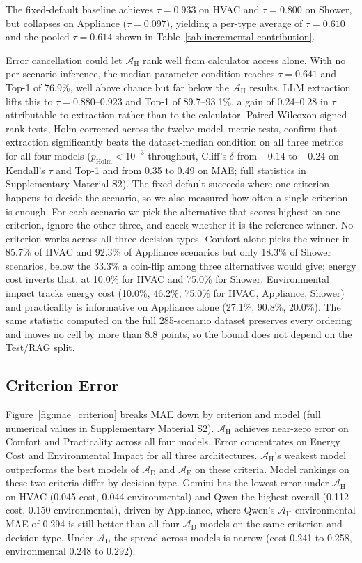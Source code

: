 \documentclass[final,3p,times]{elsarticle}
\begin{document}
The fixed-default baseline achieves $\tau = 0.933$ on HVAC and $\tau = 0.800$ on Shower, but collapses on Appliance ($\tau = 0.097$), yielding a per-type average of $\tau = 0.610$ and the pooled $\tau = 0.614$ shown in Table~\ref{tab:incremental-contribution}.

Error cancellation could let $\mathcal{A}_{\text{H}}$ rank well from calculator access alone. With no per-scenario inference, the median-parameter condition reaches $\tau = 0.641$ and Top-1 of 76.9\%, well above chance but far below the $\mathcal{A}_{\text{H}}$ results. LLM extraction lifts this to $\tau = 0.880$--$0.923$ and Top-1 of 89.7--93.1\%, a gain of 0.24--0.28 in $\tau$ attributable to extraction rather than to the calculator. Paired Wilcoxon signed-rank tests, Holm-corrected across the twelve model--metric tests, confirm that extraction significantly beats the dataset-median condition on all three metrics for all four models ($p_{\text{Holm}} < 10^{-3}$ throughout, Cliff's $\delta$ from $-0.14$ to $-0.24$ on Kendall's $\tau$ and Top-1 and from 0.35 to 0.49 on MAE; full statistics in Supplementary Material S2). 
The fixed default succeeds where one criterion happens to decide the scenario, so we also measured how often a single criterion is enough. For each scenario we pick the alternative that scores highest on one criterion, ignore the other three, and check whether it is the reference winner. No criterion works across all three decision types. Comfort alone picks the winner in 85.7\% of HVAC and 92.3\% of Appliance scenarios but only 18.3\% of Shower scenarios, below the 33.3\% a coin-flip among three alternatives would give; energy cost inverts that, at 10.0\% for HVAC and 75.0\% for Shower. Environmental impact tracks energy cost (10.0\%, 46.2\%, 75.0\% for HVAC, Appliance, Shower) and practicality is informative on Appliance alone (27.1\%, 90.8\%, 20.0\%). The same statistic computed on the full 285-scenario dataset preserves every ordering and moves no cell by more than 8.8 points, so the bound does not depend on the Test/RAG split.

\FloatBarrier
\subsection{Criterion Error}
\label{sec:res-error}
Figure~\ref{fig:mae_criterion} breaks MAE down by criterion and model (full numerical values in Supplementary Material S2). $\mathcal{A}_{\text{H}}$ achieves near-zero error on Comfort and Practicality across all four models. Error concentrates on Energy Cost and Environmental Impact for all three architectures. $\mathcal{A}_{\text{H}}$'s weakest model outperforms the best models of $\mathcal{A}_{\text{D}}$ and $\mathcal{A}_{\text{E}}$ on these criteria. Model rankings on these two criteria differ by decision type. Gemini has the lowest error under $\mathcal{A}_{\text{H}}$ on HVAC (0.045 cost, 0.044 environmental) and Qwen the highest overall (0.112 cost, 0.150 environmental), driven by Appliance, where Qwen's $\mathcal{A}_{\text{H}}$ environmental MAE of 0.294 is still better than all four $\mathcal{A}_{\text{D}}$ models on the same criterion and decision type. Under $\mathcal{A}_{\text{D}}$ the spread across models is narrow (cost 0.241 to 0.258, environmental 0.248 to 0.292).
\end{document}
